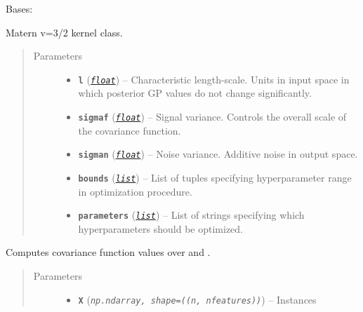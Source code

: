 \documentclass[letterpaper,10pt,english]{sphinxmanual}
\begin{document}
\begin{fulllineitems}
\label{pyGPGO.covfunc:pyGPGO.covfunc.matern32}
Bases: \href{https://docs.python.org/2/library/functions.html\#object}{}

Matern v=3/2 kernel class.
\begin{quote}\begin{description}
\item[{Parameters}] \leavevmode\begin{itemize}
\item {} 
\textbf{\texttt{l}} (\href{https://docs.python.org/2/library/functions.html\#float}{\emph{\texttt{float}}}) -- Characteristic length-scale. Units in input space in which posterior GP values do not
change significantly.

\item {} 
\textbf{\texttt{sigmaf}} (\href{https://docs.python.org/2/library/functions.html\#float}{\emph{\texttt{float}}}) -- Signal variance. Controls the overall scale of the covariance function.

\item {} 
\textbf{\texttt{sigman}} (\href{https://docs.python.org/2/library/functions.html\#float}{\emph{\texttt{float}}}) -- Noise variance. Additive noise in output space.

\item {} 
\textbf{\texttt{bounds}} (\href{https://docs.python.org/2/library/functions.html\#list}{\emph{\texttt{list}}}) -- List of tuples specifying hyperparameter range in optimization procedure.

\item {} 
\textbf{\texttt{parameters}} (\href{https://docs.python.org/2/library/functions.html\#list}{\emph{\texttt{list}}}) -- List of strings specifying which hyperparameters should be optimized.

\end{itemize}

\end{description}\end{quote}

\begin{fulllineitems}
\label{pyGPGO.covfunc:pyGPGO.covfunc.matern32.K}
Computes covariance function values over  and .
\begin{quote}\begin{description}
\item[{Parameters}] \leavevmode\begin{itemize}
\item {} 
\textbf{\texttt{X}} (\emph{\texttt{np.ndarray, shape=((n, nfeatures))}}) -- Instances


\end{itemize}
\end{description}
\end{quote}
\end{fulllineitems}
\end{fulllineitems}
\end{document}
